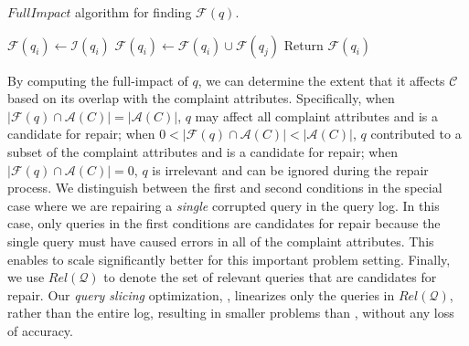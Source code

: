 
\begin{algorithm}[t]
\scriptsize
\caption{$FullImpact$ algorithm for finding $\mathcal{F}(q)$.}
\label{alg:fullimpact}
\begin{algorithmic}[2]
\STATE $\mathcal{F}(q_i) \leftarrow \mathcal{I}(q_i)$
\STATE $\mathcal{F}(q_i) \leftarrow \mathcal{F}(q_i) \cup \mathcal{F}(q_j)$
\ENDIF
\ENDFOR
\STATE Return $\mathcal{F}(q_i)$
\end{algorithmic}
\end{algorithm}
\vspace*{-.1in}

By computing the full-impact of $q$, we can determine the extent that it affects $\mathcal{C}$
based on its overlap with the complaint attributes.
Specifically, 
when $|\mathcal{F}(q) \cap \mathcal{A}(C)|=|\mathcal{A}(C)|$, $q$ may affect all complaint attributes and is a candidate for repair; 
when $0 < |\mathcal{F}(q) \cap \mathcal{A}(C)| < |\mathcal{A}(C)|$, 
$q$ contributed to a subset of the complaint attributes and is a candidate for repair;
when $|\mathcal{F}(q) \cap \mathcal{A}(C)|=0$, $q$ is irrelevant 
and can be ignored during the repair process.
We distinguish between the first and second conditions in the special case where we are repairing a \emph{single} 
corrupted query in the query log.  In this case, only queries in the first conditions are candidates for repair because 
the single query must have caused errors in all of the complaint attributes.  This enables \sys to scale significantly better
for this important problem setting. 
Finally, we use $Rel\mathcal{(Q)}$ to denote the set of relevant
queries that are candidates for repair. Our \emph{query slicing}
optimization, \qslice, linearizes only the queries in
$Rel\mathcal{(Q)}$, rather than the entire log, resulting in
smaller problems than \naive, without any loss of accuracy.

